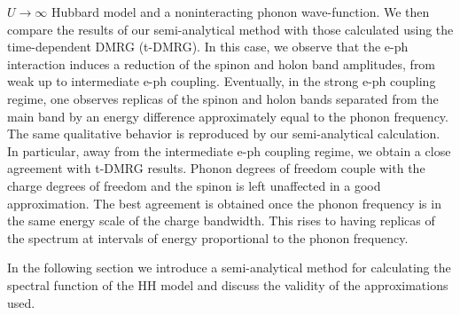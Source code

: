 \documentclass[article,11pt]{revtex4}
\begin{document}
$U\rightarrow\infty$ Hubbard model and a noninteracting phonon
wave-function. We then compare the results of our semi-analytical
method with those calculated using the time-dependent DMRG
(t-DMRG).
In this case, we observe that the e-ph interaction induces a
reduction of the spinon and holon band amplitudes, from weak up to
intermediate e-ph coupling. Eventually, in the strong e-ph
coupling regime, one observes replicas of the spinon and holon
bands separated from the main band by an energy difference
approximately equal to the phonon frequency. The same qualitative
behavior is reproduced by our semi-analytical calculation. In
particular, away from the intermediate e-ph coupling regime, we
obtain a close agreement with t-DMRG results. Phonon degrees of
freedom couple with the charge degrees of freedom and the spinon
is left unaffected in a good approximation. The best agreement is
obtained once the phonon frequency is in the same energy scale of
the charge bandwidth. This rises to having replicas of the
spectrum at intervals of energy proportional to the phonon
frequency.


In the following section we introduce a
semi-analytical method for calculating the spectral function of
the HH model and discuss the validity of the approximations used.


\end{document}
